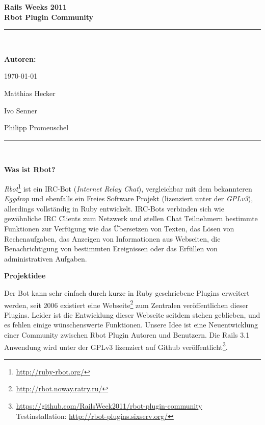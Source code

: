 \documentclass[pdftex,11pt,a4paper,notitlepage]{report}
\author{Matthias Hecker}
\newcommand{\HRule}{\rule{\linewidth}{0.5mm}}
\begin{document}
\begin{center}
{ \large \bfseries Rails Weeks 2011}\\[0.4cm]
{ \huge \bfseries Rbot Plugin Community}\\[0.1cm]
\HRule \\[0.0cm]
\end{center}

\begin{flushleft}

\textbf{Autoren:}\hfill\parbox[t]{0.7\textwidth}{\raggedleft \today}

Matthias Hecker

Ivo Senner

Philipp Promeuschel\\[0.3cm]

\HRule \\[0.5cm]

\end{flushleft}

\begin{flushleft}
\textbf{Was ist Rbot?}
\end{flushleft}

\textit{Rbot}\footnote{\url{http://ruby-rbot.org/}} ist ein IRC-Bot (\textit{Internet Relay Chat}), 
vergleichbar mit dem bekannteren
\textit{Eggdrop} und ebenfalls ein Freies Software Projekt (lizenziert unter der
\textit{GPLv3}), allerdings vollständig in Ruby entwickelt. IRC-Bots verbinden sich
wie gewöhnliche IRC Clients zum Netzwerk und stellen Chat Teilnehmern
bestimmte Funktionen zur Verfügung wie das Übersetzen von Texten, das Lösen
von Rechenaufgaben, das Anzeigen von Informationen aus Webseiten, die Benachrichtigung
von bestimmten Ereignissen oder das Erfüllen von administrativen Aufgaben.

\begin{flushleft}
\textbf{Projektidee}
\end{flushleft}

Der Bot kann sehr einfach durch kurze in Ruby geschriebene Plugins erweitert werden,
seit 2006 existiert eine Webseite\footnote{\url{http://rbot.noway.ratry.ru/}} zum Zentralen 
veröffentlichen dieser Plugins.
Leider ist die Entwicklung dieser Webseite seitdem stehen geblieben, und es fehlen
einige wünschenswerte Funktionen. Unsere Idee ist eine Neuentwicklung einer Community 
zwischen Rbot Plugin Autoren und Benutzern. Die Rails 3.1 Anwendung wird
unter der GPLv3 lizenziert auf Github 
veröffentlicht\footnote{\url{https://github.com/RailsWeek2011/rbot-plugin-community}\\
    Testinstallation: \url{http://rbot-plugins.sixserv.org/}}. 
 
\end{document}

